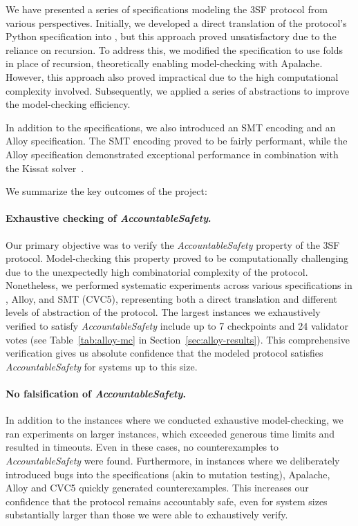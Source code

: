 
We have presented a series of specifications modeling the 3SF protocol from
various perspectives. Initially, we developed a direct translation of the
protocol's Python specification into \tlap{}, but this approach proved
unsatisfactory due to the reliance on recursion. To address this, we modified
the specification to use folds in place of recursion, theoretically enabling
model-checking with Apalache. However, this approach also proved impractical
due to the high computational complexity involved. Subsequently, we applied a
series of abstractions to improve the model-checking efficiency.

In addition to the \tlap{} specifications, we also introduced an SMT encoding
and an Alloy specification. The SMT encoding proved to be fairly performant,
while the Alloy specification demonstrated exceptional performance in
combination with the Kissat solver~\cite{SAT-Competition-2024-solvers}.

We summarize the key outcomes of the project:

\paragraph{Exhaustive checking of \textit{AccountableSafety}.} Our primary
objective was to verify the \textit{AccountableSafety} property of the 3SF
protocol. Model-checking this property proved to be computationally challenging
due to the unexpectedly high combinatorial complexity of the protocol.
Nonetheless, we performed systematic experiments across various specifications
in \tlap{}, Alloy, and SMT (CVC5), representing both a direct translation and
different levels of abstraction of the protocol. The largest instances we
exhaustively verified to satisfy \textit{AccountableSafety} include up to 7
checkpoints and 24 validator votes (see Table~\ref{tab:alloy-mc} in
Section~\ref{sec:alloy-results}). This comprehensive verification gives us
absolute confidence that the modeled protocol satisfies
\textit{AccountableSafety} for systems up to this size.

\paragraph{No falsification of \textit{AccountableSafety}.} In addition to the
instances where we conducted exhaustive model-checking, we ran experiments on
larger instances, which exceeded generous time limits and resulted in timeouts.
Even in these cases, no counterexamples to \textit{AccountableSafety} were
found. Furthermore, in instances where we deliberately introduced bugs into the
specifications (akin to mutation testing), Apalache, Alloy and CVC5 quickly
generated counterexamples. This increases our confidence that the protocol
remains accountably safe, even for system sizes substantially larger than
those we were able to exhaustively verify.

